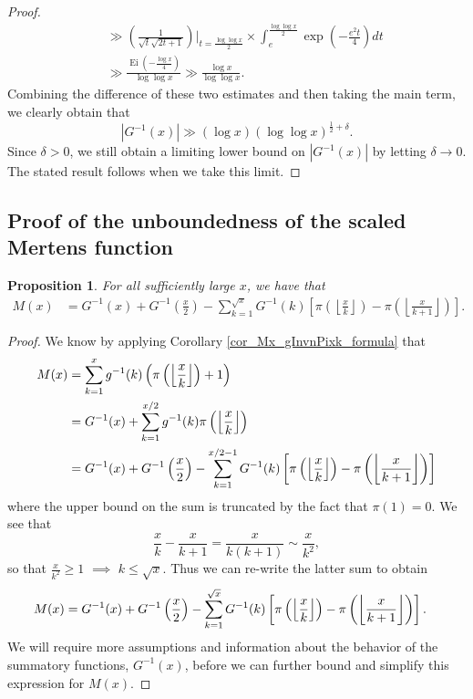 \documentclass[11pt,reqno,a4letter]{article}
\numberwithin{figure}{section}
\numberwithin{table}{section}
\newcommand{\Floor}[2]{\ensuremath{\left\lfloor \frac{#1}{#2} \right\rfloor}}
\theoremstyle{plain}
\newtheorem{prop}[theorem]{Proposition}
\numberwithin{theorem}{section}
\theoremstyle{definition}
\begin{document}
\begin{proof}
\begin{align*}
     & \phantom{:} \gg \left(\frac{1}{\sqrt{t} \sqrt{2t+1}}\right) \Biggr\rvert_{t=\frac{\log\log x}{2}} \times 
     \int_{e}^{\frac{\log\log x}{2}} \exp\left(-\frac{e^2 t}{4}\right) dt \\ 
     & \phantom{:} \gg \frac{\operatorname{Ei}\left(-\frac{\log x}{4}\right)}{\log\log x} 
     \gg \frac{\log x}{\log\log x}. 
\end{align*} 
Combining the difference of these two estimates and then taking the main term, we clearly obtain that 
\[
|G^{-1}(x)| \gg (\log x) (\log\log x)^{\frac{1}{2}+\delta}. 
\]
Since $\delta > 0$, we still obtain a limiting lower bound on $|G^{-1}(x)|$ by letting $\delta \rightarrow 0$. 
The stated result follows when we take this limit. 
\end{proof} 

\subsection{Proof of the unboundedness of the scaled Mertens function}
\label{subSection_TheCoreResultProof} 

\begin{prop} 
\label{prop_Mx_SBP_IntegralFormula} 
For all sufficiently large $x$, we have that 
\begin{align} 
\label{eqn_pf_tag_v2-restated_v2} 
M(x) & = G^{-1}(x) + G^{-1}\left(\frac{x}{2}\right) - 
     \sum_{k=1}^{\sqrt{x}} G^{-1}(k) \left[ 
     \pi\left(\Floor{x}{k}\right) - \pi\left(\Floor{x}{k+1}\right) 
     \right]. 
\end{align} 
\end{prop} 
\begin{proof} 
We know by applying Corollary \ref{cor_Mx_gInvnPixk_formula} that 
\begin{align} 
\notag
M(x) & = \sum_{k=1}^{x} g^{-1}(k) \left(\pi\left(\Floor{x}{k}\right)+1\right) \\ 
\label{eqn_proof_tag_MxFormulaInitSepTerms_v1} 
     & = G^{-1}(x) + \sum_{k=1}^{x/2} g^{-1}(k) \pi\left(\Floor{x}{k}\right) \\ 
     & = G^{-1}(x) + G^{-1}\left(\frac{x}{2}\right) - 
     \sum_{k=1}^{x/2-1} G^{-1}(k) \left[ 
     \pi\left(\Floor{x}{k}\right) - \pi\left(\Floor{x}{k+1}\right) 
     \right] 
\end{align} 
where the upper bound on the sum is truncated by the fact that $\pi(1) = 0$. 
We see that 
\[
\frac{x}{k} - \frac{x}{k+1} = \frac{x}{k(k+1)} \sim \frac{x}{k^2}, 
\]
so that $\frac{x}{k^2} \geq 1$ $\implies$ $k \leq \sqrt{x}$. 
Thus we can re-write the latter sum to obtain 
\begin{align*} 
\notag
M(x) & = G^{-1}(x) + G^{-1}\left(\frac{x}{2}\right) - 
     \sum_{k=1}^{\sqrt{x}} G^{-1}(k) \left[ 
     \pi\left(\Floor{x}{k}\right) - \pi\left(\Floor{x}{k+1}\right) 
     \right].
\end{align*} 
We will require more assumptions and information about the behavior 
of the summatory functions, $G^{-1}(x)$, before we can further bound and 
simplify this expression for $M(x)$. 
\end{proof} 
\end{document}
